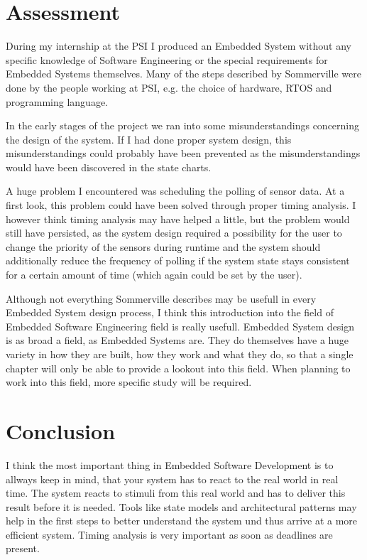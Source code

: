 \documentclass[10pt,a4paper,titlepage,draft]{scrartcl} %
\begin{document}
\section{Assessment}
During my internship at the PSI I produced an Embedded System without any specific knowledge of Software Engineering or the special requirements for Embedded Systems themselves.
Many of the steps described by Sommerville were done by the people working at PSI, e.g. the choice of hardware, RTOS and programming language.

In the early stages of the project we ran into some misunderstandings concerning the design of the system. If I had done proper system design, this misunderstandings could probably have been prevented as the misunderstandings would have been discovered in the state charts.

A huge problem I encountered was scheduling the polling of sensor data.
At a first look, this problem could have been solved through proper timing analysis.
I however think timing analysis may have helped a little, but the problem would still have persisted, as the system design required a possibility for the user to change the priority of the sensors during runtime and the system should additionally reduce the frequency of polling if the system state stays consistent for a certain amount of time (which again could be set by the user).

Although not everything Sommerville describes may be usefull in every Embedded System design process, I think this introduction into the field of Embedded Software Engineering field is really usefull.
Embedded System design is as broad a field, as Embedded Systems are.
They do themselves have a huge variety in how they are built, how they work and what they do, so that a single chapter will only be able to provide a lookout into this field.
When planning to work into this field, more specific study will be required.

\section{Conclusion}
I think the most important thing in Embedded Software Development is to allways keep in mind, that your system has to react to the real world in real time. The system reacts to stimuli from this real world and has to deliver this result before it is needed. Tools like state models and architectural patterns may help in the first steps to better understand the system und thus arrive at a more efficient system. Timing analysis is very important as soon as deadlines are present.
\end{document}
